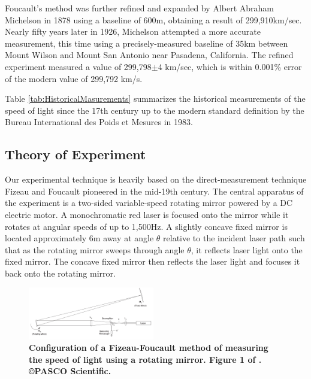 \documentclass[twocolumn]{article}
\begin{document}
		Foucault's method was further refined and expanded by Albert Abraham Michelson in 1878 using a baseline of 600m, obtaining a result of 299,910km/sec.\cite{michelson_experimental_1878}
		Nearly fifty years later in 1926, Michelson attempted a more accurate measurement, this time using a precisely-measured baseline of 35km between Mount Wilson and Mount San Antonio near Pasadena, California.
		The refined experiment measured a value of 299,798$\pm$4 km/sec, which is within 0.001\% error of the modern value of 299,792 km/s.\cite{michelson_measurement_1927}
		
		Table \ref{tab:HistoricalMasurements} summarizes the historical measurements of the speed of light since the 17th century up to the modern standard definition by the Bureau International des Poids et Mesures in 1983.\cite{_bipm_1984}
		
		
	\subsection{Theory of Experiment}
		Our experimental technique is heavily based on the direct-measurement technique Fizeau and Foucault pioneered in the mid-19th century.
		The central apparatus of the experiment is a two-sided variable-speed rotating mirror powered by a DC electric motor.
		A monochromatic red laser is focused onto the mirror while it rotates at angular speeds of up to 1,500Hz.
		A slightly concave fixed mirror is located approximately 6m away at angle $\theta$ relative to the incident laser path such that as the rotating mirror sweeps through angle $\theta$, it reflects laser light onto the fixed mirror.
		The concave fixed mirror then reflects the laser light and focuses it back onto the rotating mirror.
		
		\begin{figure}[!ht]
			\centering
			\includegraphics[width=0.49\textwidth]{Images/FoucaultMethodDiagram.png}
			\caption{\textbf{Configuration of a Fizeau-Foucault method of measuring the speed of light using a rotating mirror. Figure 1 of \cite{lee_instruction_????}. \copyright PASCO Scientific.}}
			\label{fig:FoucaultDiagram}
		\end{figure}
		
\end{document}
